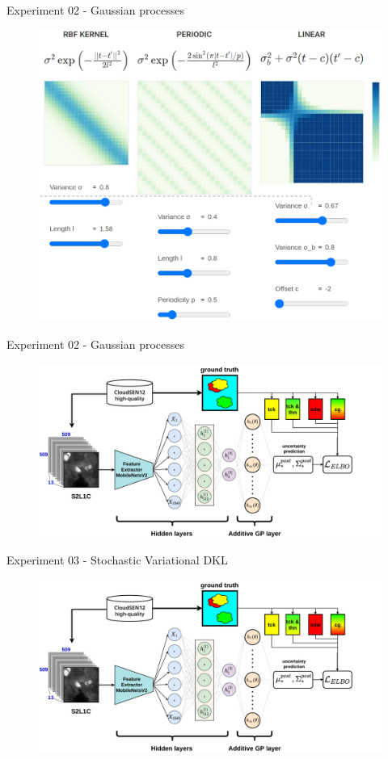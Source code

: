 \begin{frame}{Experiment 02 - Gaussian processes}
	\begin{figure}
		\centering
		\includegraphics[width=0.75\linewidth]{images/gp03}
		\caption{}
		\label{fig:gp01}
	\end{figure}
\end{frame}

\begin{frame}{Experiment 02 - Gaussian processes}
	\begin{figure}
		\centering
		\includegraphics[width=1\linewidth]{images/metodology.pdf}
		\caption{}
		\label{fig:gp01}
	\end{figure}
\end{frame}



\begin{frame}{Experiment 03 - Stochastic Variational DKL}
	\begin{figure}
		\centering
		\includegraphics[width=1\linewidth]{images/metodology.pdf}
		\caption{}
		\label{fig:gp01}
	\end{figure}
\end{frame}

